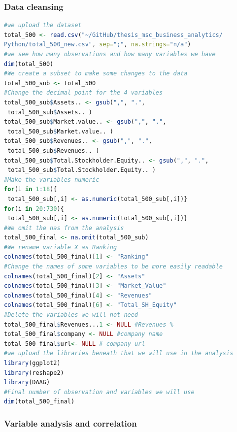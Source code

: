 \documentclass{article}
\begin{document}
\subsubsection{Data cleansing}\label{r:data cleansing}
\begin{lstlisting}[language=R]
#we upload the dataset
total_500 <- read.csv("~/GitHub/thesis_msc_business_analytics/
Python/total_500_new.csv", sep=";", na.strings="n/a")
#we see how many observations and how many variables we have
dim(total_500)
#We create a subset to make some changes to the data
total_500_sub <- total_500
#Change the decimal point for the 4 variables
total_500_sub$Assets.. <- gsub(",", ".",
 total_500_sub$Assets.. )
total_500_sub$Market.value.. <- gsub(",", ".",
 total_500_sub$Market.value.. )
total_500_sub$Revenues.. <- gsub(",", ".",
 total_500_sub$Revenues.. )
total_500_sub$Total.Stockholder.Equity.. <- gsub(",", ".",
 total_500_sub$Total.Stockholder.Equity.. )
#Make the variables numeric
for(i in 1:18){
 total_500_sub[,i] <- as.numeric(total_500_sub[,i])}  
for(i in 20:730){
 total_500_sub[,i] <- as.numeric(total_500_sub[,i])} 
#We omit the nas from the analysis
total_500_final <- na.omit(total_500_sub)
#We rename variable X as Ranking
colnames(total_500_final)[1] <- "Ranking"
#Change the names of some variables to be more easily readable
colnames(total_500_final)[2] <- "Assets"
colnames(total_500_final)[3] <- "Market_Value"
colnames(total_500_final)[4] <- "Revenues"
colnames(total_500_final)[6] <- "Total_SH_Equity"
#Delete the variables we will not need
total_500_final$Revenues...1 <- NULL #Revenues %
total_500_final$company <- NULL #company name
total_500_final$url<- NULL # company url
#we upload the libraries beneath that we will use in the analysis
library(ggplot2)
library(reshape2)
library(DAAG)
#Final number of observation and variables we will use
dim(total_500_final)
\end{lstlisting}

\subsubsection{Variable analysis and correlation}
\end{document}
